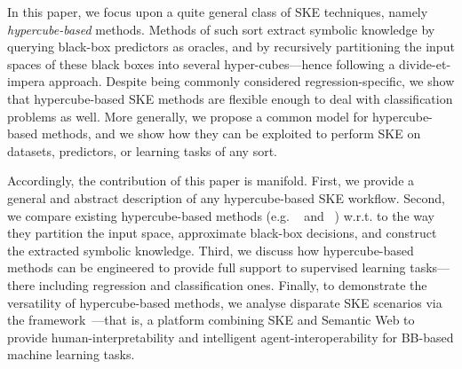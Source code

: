 \documentclass[
]{ceurart}
\begin{document}
In this paper, we focus upon a quite general class of SKE techniques, namely \emph{hypercube-based} methods.
%
Methods of such sort extract symbolic knowledge by querying black-box predictors as oracles, and by recursively partitioning the input spaces of these black boxes into several hyper-cubes---hence following a divide-et-impera approach.
%
Despite being commonly considered regression-specific, we show that hypercube-based SKE methods are flexible enough to deal with classification problems as well.
%
More generally, we propose a common model for hypercube-based methods, and we show how they can be exploited to perform SKE on datasets, predictors, or learning tasks of any sort.

Accordingly, the contribution of this paper is manifold.
%
First, we provide a general and abstract description of any hypercube-based SKE workflow.
%
Second, we compare existing hypercube-based methods (e.g. \iter{}~\cite{huysmans2006iter} and \gridex{}~\cite{gridex-extraamas2021}) w.r.t. to the way they partition the input space, approximate black-box decisions, and construct the extracted symbolic knowledge.
%
Third, we discuss how hypercube-based methods can be engineered to provide full support to supervised learning tasks---there including regression and classification ones.
%
Finally, to 
%
demonstrate the versatility of hypercube-based methods, we analyse disparate SKE scenarios via the \psyke{} framework~\cite{psyke-woa2021,psyke-ia2022,psyke-extraamas2022}---that is, a platform combining SKE and Semantic Web to provide human-interpretability and intelligent agent-interoperability for BB-based machine learning tasks.
%
%
\end{document}
